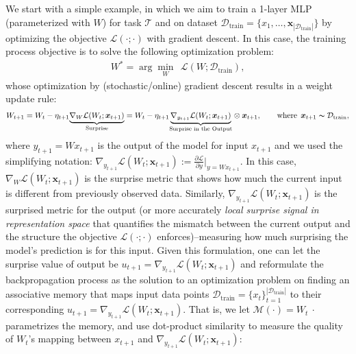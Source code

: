 \documentclass{article}
\newcommand{\undermath}[2]{\underset{#1}{\underbrace{#2}}}
\newcommand{\M}[0]{\mathcal{M}}
\newcommand{\head}[1]{\vspace{1.7mm}\noindent{{\textcolor{c4}{\bf #1.}}}}
\begin{document}
\head{A Simple Example of MLP Training}
We start with a simple example, in which we aim to train a 1-layer MLP (parameterized with $W$) for task $\mathcal{T}$ and on dataset $\mathcal{D}_{\text{train}} = \{x_1, \dots, \boldsymbol{x}_{|\mathcal{D}_{\text{train}}|}\}$ by optimizing the objective $\mathcal{L}(\cdot; \cdot)$ with gradient descent. In this case, the training process objective is to solve the following optimization problem:
\begin{align}\label{eq:example1}
    W^{*} = \arg\min_{W} \:\: \mathcal{L}(W; \mathcal{D}_{\text{train}}), 
\end{align}
whose optimization by (stochastic/online) gradient descent results in a weight update rule:
\begin{align}\label{eq:gradient-dual}
    W_{t+1} = W_{t} - \eta_{t+1} \undermath{\text{Surprise}}{\nabla_{W} \mathcal{L}(W_t; \boldsymbol{x}_{t+1})} = W_{t} - \eta_{t+1} \undermath{\text{Surprise in the Output}}{\nabla_{y_{t+1}} \mathcal{L}(W_t; \boldsymbol{x}_{t+1})} \otimes \boldsymbol{x}_{t+1}, \qquad \text{where}\:\: \boldsymbol{x}_{t+1} \thicksim \mathcal{D}_{\text{train}},
\end{align}
where $y_{t+1}=Wx_{t+1}$ is the output of the model for input $x_{t+1}$ and we used the simplifying notation: $\nabla_{y_{t+1}} \mathcal{L}(W_t; \boldsymbol{x}_{t+1}):= \frac{\partial \mathcal{L}}{\partial y}|_{y = W x_{t+1}}$.  In this case, $\nabla_{W} \mathcal{L}(W_t; \boldsymbol{x}_{t+1})$ is the surprise metric that shows how much the current input is different from previously observed data. Similarly, $\nabla_{y_{t+1}} \mathcal{L}(W_t; \boldsymbol{x}_{t+1})$ is the surprised metric for the output (or more accurately \emph{local surprise signal in representation space} that quantifies the mismatch between the current output and the structure the objective $\mathcal{L}(\cdot; \cdot)$ enforces)–measuring how much surprising the model's prediction is for this input. Given this formulation, one can let the surprise value of output be $u_{t+1} = \nabla_{y_{t+1}} \mathcal{L}(W_t; \boldsymbol{x}_{t+1})$ and reformulate the backpropagation process {as the solution to an optimization problem} on finding an  associative memory that maps input data points $\mathcal{D}_{\text{train}} = \{x_t\}_{t=1}^{|\mathcal{D}_{\text{train}}|}$ to their corresponding $u_{t+1} = \nabla_{y_{t+1}} \mathcal{L}(W_t; \boldsymbol{x}_{t+1})$. That is, we let $\M(\cdot) = W_t \: \cdot$ parametrizes the memory, and use dot-product similarity to measure the quality of $W_t$'s mapping between $x_{t+1}$ and $\nabla_{y_{t+1}} \mathcal{L}(W_t; \boldsymbol{x}_{t+1})$:
\end{document}
